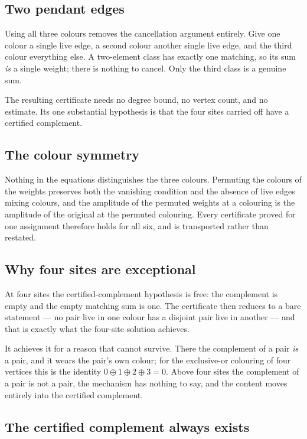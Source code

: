 \documentclass[11pt]{article}
\theoremstyle{definition}
\theoremstyle{remark}
\begin{document}
\subsection*{Two pendant edges}

Using all three colours removes the cancellation argument entirely. Give one colour a
single live edge, a second colour another single live edge, and the third colour
everything else. A two-element class has exactly one matching, so its sum \emph{is} a
single weight; there is nothing to cancel. Only the third class is a genuine sum.

The resulting certificate needs no degree bound, no vertex count, and no estimate. Its
one substantial hypothesis is that the four sites carried off have a certified complement.

\subsection*{The colour symmetry}

Nothing in the equations distinguishes the three colours. Permuting the colours of the
weights preserves both the vanishing condition and the absence of live edges mixing
colours, and the amplitude of the permuted weights at a colouring is the amplitude of the
original at the permuted colouring. Every certificate proved for one assignment therefore
holds for all six, and is transported rather than restated.

\subsection*{Why four sites are exceptional}

At four sites the certified-complement hypothesis is free: the complement is empty and the
empty matching sum is one. The certificate then reduces to a bare statement --- no pair
live in one colour has a disjoint pair live in another --- and that is exactly what the
four-site solution achieves.

It achieves it for a reason that cannot survive. There the complement of a pair \emph{is}
a pair, and it wears the pair's own colour; for the exclusive-or colouring of four
vertices this is the identity $0\oplus 1\oplus 2\oplus 3 = 0$. Above four sites the
complement of a pair is not a pair, the mechanism has nothing to say, and the content
moves entirely into the certified complement.

\subsection*{The certified complement always exists}
\end{document}
